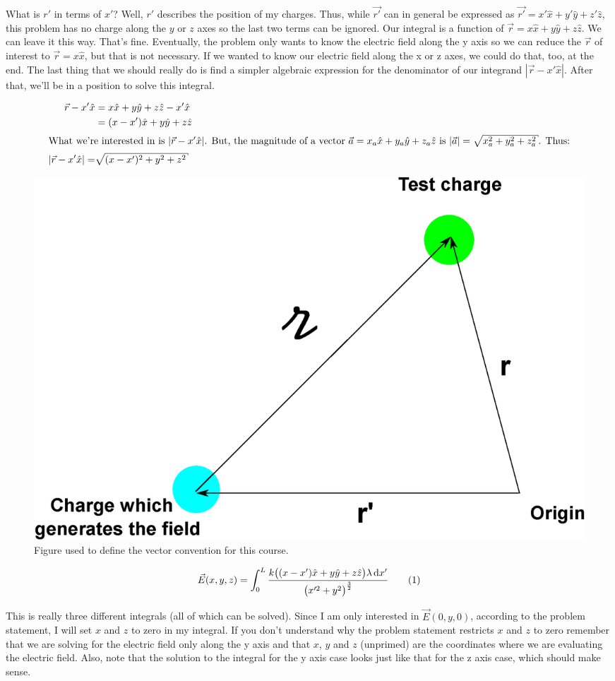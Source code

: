 \begin{homeworkProblem}[Problem 23.42]
 What is $r'$ in terms of $x'$? Well, $r'$ describes the position of my charges. Thus, while $\vec{r'}$ can in general be expressed as  $ \vec{r'} = x' \hat{x} + y'\hat{y} + z'\hat{z}$, this problem has no charge along the $y$ or $z$ axes so the last two terms can be ignored. Our integral is a function of $\vec{r} = x \hat{x} + y\hat{y} + z\hat{z}$. We can leave it this way. That's fine. Eventually, the problem only wants to know the electric field along the y axis so we can reduce the $\vec{r}$ of interest to $\vec{r} = x\hat{x}$, but that is not necessary. If we wanted to know our electric field along the x or z axes, we could do that, too, at the end. The last thing that we should really do is find a simpler algebraic expression for the denominator of our integrand $|\vec{r}-x'\hat{x}|$. After that, we'll be in a position to solve this integral. 

\begin{align}
    \vec{r} - x'\hat{x} &= x\hat{x} + y\hat{y} + z\hat{z} - x'\hat{x} \nonumber \\
		&= (x - x')\hat{x} + y\hat{y} + z\hat{z} \nonumber \\
		\intertext{What we're interested in is $|\vec{r} - x'\hat{x}|$. But, the magnitude of a vector $\vec{a} = x_a \hat{x} + y_a \hat{y} + z_a \hat{z}$ is $|\vec{a}| = \sqrt{x^2_a + y^2_a + z^2_a}$. Thus:} \nonumber
		|\vec{r} - x'\hat{x}| =& \sqrt{(x-x')^2 + y^2 + z^2} \nonumber
\end{align}

\begin{figure}%
\centering
\includegraphics[width=.55\columnwidth]{vecs.eps}%
\caption{Figure used to define the vector convention for this course.}%
\label{fig:vecs.eps}%
\end{figure}

\[ \vec{E}(x,y,z) = \int_0^L \frac{k \big((x-x')\hat{x}+y\hat{y}+z\hat{z}\big) \lambda \diff x'}{\big( x'^2 + y^2\big)^\frac{3}{2}} \addtag \]

This is really three different integrals (all of which can be solved). Since I am only interested in $\vec{E}(0,y,0)$, according to the problem statement, I will set $x$ and $z$ to zero in my integral. If you don't understand why the problem statement restricts $x$ and $z$ to zero remember that we are solving for the electric field only along the y axis and that $x$, $y$ and $z$ (unprimed) are the coordinates where we are evaluating the electric field. Also, note that the solution to the integral for the y axis case looks just like that for the z axis case, which should make sense.


\end{homeworkProblem}
